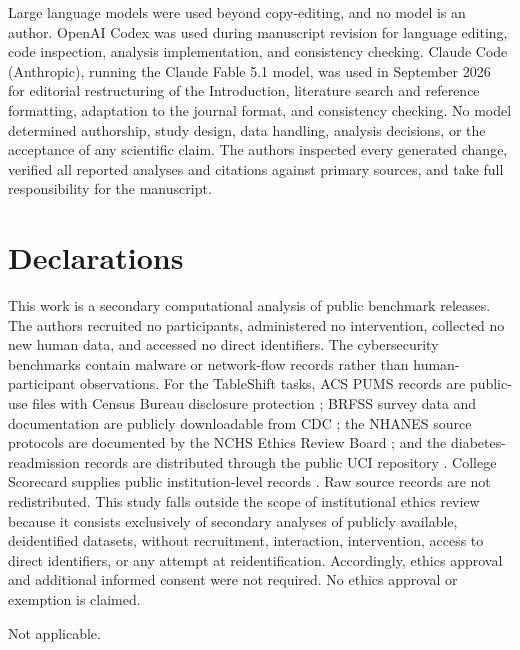 \documentclass[referee,lineno,pdflatex,sn-vancouver-num]{sn-jnl}
\theoremstyle{thmstyleone}%
\theoremstyle{thmstyletwo}%
\theoremstyle{thmstylethree}%
\begin{document}
Large language models were used beyond copy-editing, and no model is an author. OpenAI Codex was used during manuscript revision for language editing, code inspection, analysis implementation, and consistency checking. Claude Code (Anthropic), running the Claude Fable 5.1 model, was used in September 2026 for editorial restructuring of the Introduction, literature search and reference formatting, adaptation to the journal format, and consistency checking. No model determined authorship, study design, data handling, analysis decisions, or the acceptance of any scientific claim. The authors inspected every generated change, verified all reported analyses and citations against primary sources, and take full responsibility for the manuscript.

\backmatter

\section*{Declarations}

This work is a secondary computational analysis of public benchmark releases. The authors recruited no participants, administered no intervention, collected no new human data, and accessed no direct identifiers. The cybersecurity benchmarks contain malware or network-flow records rather than human-participant observations. For the TableShift tasks, ACS PUMS records are public-use files with Census Bureau disclosure protection \cite{uscensus2026pums}; BRFSS survey data and documentation are publicly downloadable from CDC \cite{cdc2022brfss}; the NHANES source protocols are documented by the NCHS Ethics Review Board \cite{cdc2026nhanesethics}; and the diabetes-readmission records are distributed through the public UCI repository \cite{uci2014diabetes}. College Scorecard supplies public institution-level records \cite{used2026scorecard}. Raw source records are not redistributed. This study falls outside the scope of institutional ethics review because it consists exclusively of secondary analyses of publicly available, deidentified datasets, without recruitment, interaction, intervention, access to direct identifiers, or any attempt at reidentification. Accordingly, ethics approval and additional informed consent were not required. No ethics approval or exemption is claimed.

Not applicable.
\end{document}
